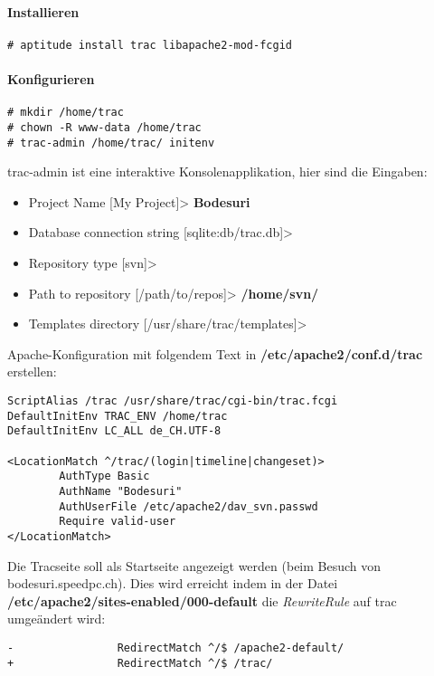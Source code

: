 \documentclass[12pt,halfparskip]{scrreprt}
\begin{document}
\paragraph{Installieren}

\begin{verbatim}
# aptitude install trac libapache2-mod-fcgid
\end{verbatim}

\paragraph{Konfigurieren}

\begin{verbatim}
# mkdir /home/trac
# chown -R www-data /home/trac
# trac-admin /home/trac/ initenv
\end{verbatim}

trac-admin ist eine interaktive Konsolenapplikation, hier sind die Eingaben:

\begin{itemize}
	\item Project Name [My Project]> \textbf{Bodesuri}
	\item Database connection string [sqlite:db/trac.db]>
	\item Repository type [svn]>
	\item Path to repository [/path/to/repos]> \textbf{/home/svn/}
	\item Templates directory [/usr/share/trac/templates]>
\end{itemize}

Apache-Konfiguration mit folgendem Text in \textbf{/etc/apache2/conf.d/trac} erstellen:

\begin{verbatim}
ScriptAlias /trac /usr/share/trac/cgi-bin/trac.fcgi
DefaultInitEnv TRAC_ENV /home/trac
DefaultInitEnv LC_ALL de_CH.UTF-8

<LocationMatch ^/trac/(login|timeline|changeset)>
        AuthType Basic
        AuthName "Bodesuri"
        AuthUserFile /etc/apache2/dav_svn.passwd
        Require valid-user
</LocationMatch>
\end{verbatim}

Die Tracseite soll als Startseite angezeigt werden (beim Besuch von bodesuri.speedpc.ch). Dies wird erreicht indem in der Datei \textbf{/etc/apache2/sites-enabled/000-default} die \emph{RewriteRule} auf trac umgeändert wird:

\begin{verbatim}
-                RedirectMatch ^/$ /apache2-default/
+                RedirectMatch ^/$ /trac/
\end{verbatim}
\end{document}
